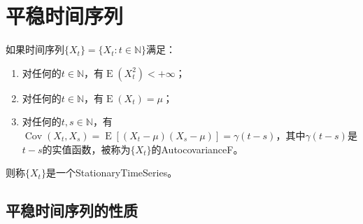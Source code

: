 \section{平稳时间序列}

\begin{definition}
	如果时间序列$\{X_t\}=\{X_t:t\in\mathbb{N}\}$满足：
	\begin{enumerate}
		\item 对任何的$t\in\mathbb{N}$，有$\operatorname{E}(X_t^2)<+\infty$；
		\item 对任何的$t\in\mathbb{N}$，有$\operatorname{E}(X_t)=\mu$；
		\item 对任何的$t,s\in\mathbb{N}$，有$\operatorname{Cov}(X_t,X_s)=\operatorname{E}[(X_t-\mu)(X_s-\mu)]=\gamma(t-s)$，其中$\gamma(t-s)$是$t-s$的实值函数，被称为$\{X_t\}$的\gls{AutocovarianceF}。
	\end{enumerate}
	则称$\{X_t\}$是一个\gls{StationaryTimeSeries}。
\end{definition}
\subsection{平稳时间序列的性质}
